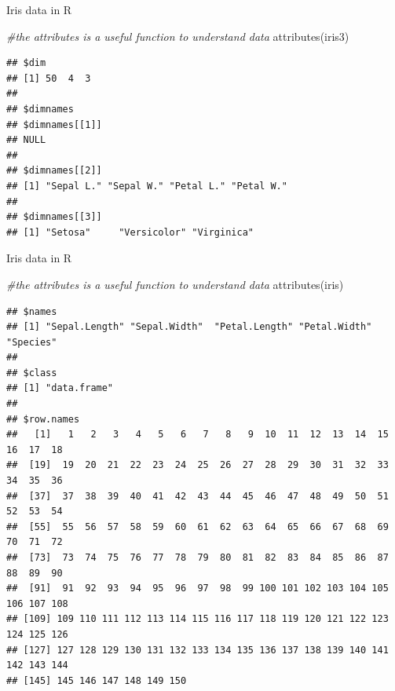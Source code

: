 \documentclass[
  ignorenonframetext,
]{beamer}
\newenvironment{Shaded}{\begin{snugshade}}{\end{snugshade}}
\newcommand{\CommentTok}[1]{\textcolor[rgb]{0.56,0.35,0.01}{\textit{#1}}}
\newcommand{\FunctionTok}[1]{\textcolor[rgb]{0.00,0.00,0.00}{#1}}
\newcommand{\NormalTok}[1]{#1}
\begin{document}
\begin{frame}[fragile]{Iris data in R}
\protect\hypertarget{iris-data-in-r-2}{}
\begin{Shaded}
\begin{Highlighting}[]
\CommentTok{\#the attributes is a useful function to understand data}
\FunctionTok{attributes}\NormalTok{(iris3)}
\end{Highlighting}
\end{Shaded}

\begin{verbatim}
## $dim
## [1] 50  4  3
## 
## $dimnames
## $dimnames[[1]]
## NULL
## 
## $dimnames[[2]]
## [1] "Sepal L." "Sepal W." "Petal L." "Petal W."
## 
## $dimnames[[3]]
## [1] "Setosa"     "Versicolor" "Virginica"
\end{verbatim}
\end{frame}

\begin{frame}[fragile]{Iris data in R}
\protect\hypertarget{iris-data-in-r-3}{}
\begin{Shaded}
\begin{Highlighting}[]
\CommentTok{\#the attributes is a useful function to understand data}
\FunctionTok{attributes}\NormalTok{(iris)}
\end{Highlighting}
\end{Shaded}

\begin{verbatim}
## $names
## [1] "Sepal.Length" "Sepal.Width"  "Petal.Length" "Petal.Width"  "Species"     
## 
## $class
## [1] "data.frame"
## 
## $row.names
##   [1]   1   2   3   4   5   6   7   8   9  10  11  12  13  14  15  16  17  18
##  [19]  19  20  21  22  23  24  25  26  27  28  29  30  31  32  33  34  35  36
##  [37]  37  38  39  40  41  42  43  44  45  46  47  48  49  50  51  52  53  54
##  [55]  55  56  57  58  59  60  61  62  63  64  65  66  67  68  69  70  71  72
##  [73]  73  74  75  76  77  78  79  80  81  82  83  84  85  86  87  88  89  90
##  [91]  91  92  93  94  95  96  97  98  99 100 101 102 103 104 105 106 107 108
## [109] 109 110 111 112 113 114 115 116 117 118 119 120 121 122 123 124 125 126
## [127] 127 128 129 130 131 132 133 134 135 136 137 138 139 140 141 142 143 144
## [145] 145 146 147 148 149 150
\end{verbatim}
\end{frame}
\end{document}
